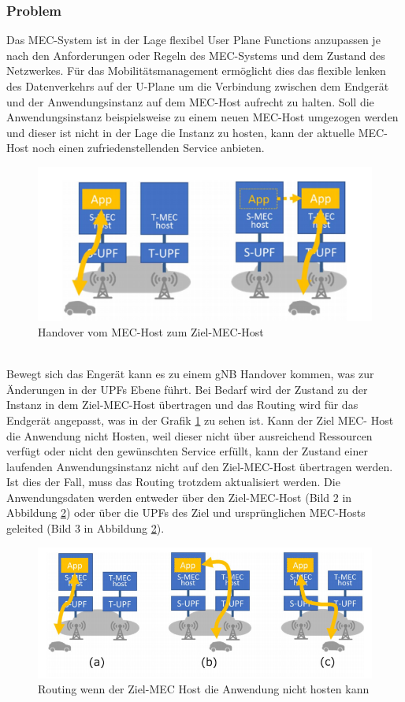 \documentclass[runningheads]{llncs}
\numberwithin{figure}{section}
\begin{document}
\subsubsection{Problem}
Das MEC-System ist in der Lage flexibel User Plane Functions anzupassen je nach den Anforderungen oder Regeln des MEC-Systems 
und dem Zustand des Netzwerkes. Für das Mobilitätsmanagement ermöglicht dies das flexible lenken des Datenverkehrs auf der U-Plane
um die Verbindung zwischen dem Endgerät und der Anwendungsinstanz auf dem MEC-Host aufrecht zu halten. Soll die Anwendungsinstanz
beispielsweise zu einem neuen MEC-Host umgezogen werden und dieser ist nicht in der Lage die Instanz zu hosten, kann der aktuelle
MEC-Host noch einen zufriedenstellenden Service anbieten.
\begin{figure}
  \includegraphics[width=\linewidth]{images/Verschieben_Instanz.png}
  \caption{Handover vom MEC-Host zum Ziel-MEC-Host}
  \label{fig:Verschieben_Instanz}
\end{figure}
\\
Bewegt sich das Engerät kann es zu einem gNB Handover kommen, was zur Änderungen in der UPFs Ebene führt. 
Bei Bedarf wird der Zustand zu der Instanz in dem Ziel-MEC-Host übertragen und das Routing wird für das Endgerät angepasst, 
was in der Grafik \ref{fig:Verschieben_Instanz} zu sehen ist.
Kann der Ziel MEC- Host die Anwendung nicht Hosten, weil dieser nicht über ausreichend Ressourcen verfügt oder nicht den gewünschten Service
erfüllt, kann der Zustand einer laufenden Anwendungsinstanz nicht auf den Ziel-MEC-Host übertragen werden. Ist dies der Fall, muss das Routing
trotzdem aktualisiert werden. Die Anwendungsdaten werden entweder über den Ziel-MEC-Host (Bild 2 in Abbildung \ref{fig:MEC_ERROR}) 
oder über die UPFs des Ziel und ursprünglichen MEC-Hosts geleited (Bild 3 in Abbildung \ref{fig:MEC_ERROR}).
\begin{figure}
  \includegraphics[width=\linewidth]{images/MEC_host_Error.png}
  \caption{Routing wenn der Ziel-MEC Host die Anwendung nicht hosten kann}
  \label{fig:MEC_ERROR}
\end{figure}
\end{document}
